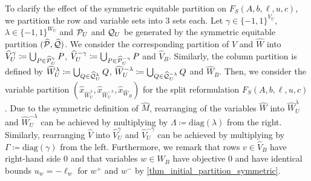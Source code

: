 \documentclass[pdflatex,sn-mathphys-num]{sn-jnl}%
\theoremstyle{thmstyleone}%
\theoremstyle{thmstylethree}%
\theoremstyle{thmstyletwo}%
\newcommand{\diag}{\mathrm{diag}}
\begin{document}
To clarify the effect of the symmetric equitable partition on $F_S(A,b,\ell,u,c)$, we partition the row and variable sets into 3 sets each. Let $\gamma\in \{-1,1\}^{V_U}$, $\lambda \in \{-1,1\}^{W_U}$ and $\mathcal{P}_U$ and $\mathcal{Q}_U$ be generated by the symmetric equitable partition $(\widehat{\mathcal{P}},\widehat{\mathcal{Q}})$.
We consider the corresponding partition of $\widehat{V}$ and $\widehat{W}$ into $\widehat{V}^\gamma_U \coloneqq \bigcup_{P\in \widehat{\MP}^\gamma_U} P$, $\widehat{V}^{-\gamma}_U \coloneqq \bigcup_{P\in \widehat{\MP}^{-\gamma}_U} P$ and $\widehat{V}_B$. Similarly, the column partition is defined by $\widehat{W}^\lambda_U \coloneqq \bigcup_{Q\in \widehat{\MQ}^\lambda_U} Q$, $\widehat{W}^{-\lambda}_U \coloneqq \bigcup_{Q\in \widehat{\MQ}^{-\lambda}_U} Q$ and $\widehat{W}_B$. Then, we consider the variable partition $(\widehat{x}_{\widehat{W}^\lambda_U}, \widehat{x}_{\widehat{W}^{-\lambda}_U}, \widehat{x}_{\widehat{W}_B})$ for the split reformulation $F_S(A,b,\ell,u,c)$. Due to the symmetric definition of $\widehat{M}$, rearranging of the variables $\widehat{W}$ into $\widehat{W}^{\lambda}_U$ and $\widehat{W}^{-\lambda}_U$ can be achieved by multiplying by $\Lambda \coloneqq \diag(\lambda)$ from the right. Similarly, rearranging $\widehat{V}$ into $\widehat{V}^\gamma_U$ and $\widehat{V}^{-\gamma}_U$ can be achieved by multiplying by $\Gamma \coloneqq \diag(\gamma)$ from the left.
Furthermore, we remark that rows $v\in \widehat{V}_B$ have right-hand side $0$ and that variables $w\in W_B$ have objective $0$ and have identical bounds $u_w = -\ell_w$ for $w^+$ and $w^-$ by \cref{thm_initial_partition_symmetric}. 
\end{document}
